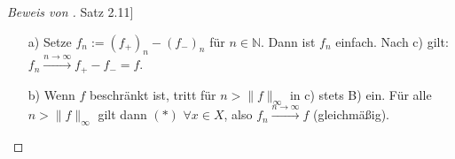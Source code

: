 \documentclass[a4paper]{scrreprt}
\newcommand{\N}{\mathbb{N}}
\newcommand{\jhyperref}[2]{\hyperref[j_#1]{#2}}
\newcommand{\jlink}[1]{\jhyperref{#1}{#1}}
\theoremstyle{plain}
\theoremstyle{definition}
\begin{document}
{{{\begin{proof}[Beweis von \jlink{Satz 2.11}]
\begin{itemize}
        \vspace{12pt}
        TODO: BILD
        \vspace{12pt}
        
        Ferner gilt
        \begin{displaymath}
            A_{jn} =
                \begin{cases}
                    A_{2j,n+1} \dot{\cup} A_{2j+1,n+1}, &j=0,\dots,n\cdot 2^n-1\\
                    \bigcup_{k=n\cdot 2^{n+1}}^{(n+1)\cdot 2^{n+1}} A_{k,n+1}, & j=n\cdot 2^n
                \end{cases}.
        \end{displaymath}
        Für $x \in A_{jn}$ gilt
        \begin{displaymath}
            f_n(x) = j\cdot 2^{-n}
            \begin{cases}
                = 2\cdot j \cdot 2^{-(n+1)} = f_{n+1}(x), & x\in A_{2j,n+1} \\
                \le (2\cdot j +1)\cdot 2^{-(n+1)} = f_{n+1}(x), & x\in A_{2j+1, n+1}
            \end{cases}
        \end{displaymath}
        Also gilt $f_n(x) \le f_{n+1}(x) \ \forall x\in A_{jn}$, falls $j < n\cdot 2^n$.\\
        Sei $x\in A_{n\cdot 2^n}$. Dann gilt $f_n(x) = n = n\cdot 2^{n+1}\cdot 2^{-(n+1)} \le k\cdot 2^{-(n+1)} = f_{n+1}(x)$ für alle $k\in\{n\cdot 2^{n+1}, \dots, (n+1)\cdot 2^{n+1}\}$.\\
        \uline{Also}: $f_n \le f_{n+1} \ (\forall n\in\N)$.
        \begin{itemize}
            \item[A)]
                Wenn $f(x) = \infty$, dann $x\in A_{n\cdot 2^n,n}$ für alle $n\in\N \Rightarrow f_n(x) = n \xrightarrow{n\rightarrow \infty} \infty = f(x)$.
            \item[B)]
                Wenn $f(x) < \infty$, dann liegt $x$ für alle $n\in\N$ mit $n>f(x)$ in einem $A_{j(n),n}$ mit $j(n) < n\cdot 2^{-n}$. Dann folgt
                \begin{displaymath}
                    f_n(x) = j(n)\cdot 2^{-n} \le f(x) \le f_n(x) + 2^{-n} \ \ \ (*).
                \end{displaymath}
                Und somit $|f(x)-f_n(x)| \le 2^{-n} \xrightarrow{n\rightarrow \infty} 0$, woraus Behauptung c) folgt.
        \end{itemize}
        \item[a)]
            Setze $f_n := (f_+)_n - (f_-)_n$ für $n\in\N$. Dann ist $f_n$ einfach. Nach c) gilt: $f_n\xrightarrow{n\rightarrow\infty} f_+ - f_- = f$.
        \item[b)]
            Wenn $f$ beschränkt ist, tritt für $n>\lVert f\rVert_\infty$ in c) stets B) ein. Für alle $n>\lVert f\rVert_\infty$ gilt dann $(*)$ $\forall x\in X$, also $f_n \xrightarrow{n\rightarrow \infty} f$ (gleichmäßig).
    \end{itemize}
\end{proof}
        	
}}}
\end{document}
